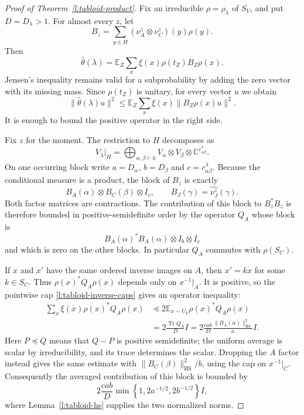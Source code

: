 \begin{proof}[Proof of Theorem~\ref{l:tabloid-product}]
Fix an irreducible $\rho=\rho_\lambda$ of $S_V$, and put
$D=D_\lambda>1$.  For almost every $z$, let
\[
 B_z=\sum_{y\in H}(\nu_A^z\otimes\nu_C^z)(y)\rho(y).
\]
Then
\[
 \widehat\theta(\lambda)
 =\mathbb E_Z\sum_x\xi(x)\rho(t_Z)B_Z\rho(x).
\]
Jensen's inequality remains valid for a subprobability by adding
the zero vector with its missing mass.  Since $\rho(t_Z)$ is
unitary, for every vector $u$ we obtain
\begin{equation}
 \|\widehat\theta(\lambda)u\|^2
 \le\mathbb E_Z\sum_x\xi(x)\|B_Z\rho(x)u\|^2.
 \label{l:tabloid-jensen}
\end{equation}
It is enough to bound the positive operator in the right side.

Fix $z$ for the moment.  The restriction to $H$ decomposes as
\[
 V_\lambda\big|_H
 =\bigoplus_{\alpha,\beta\vdash h}
      V_\alpha\otimes V_\beta\otimes
      \mathbb C^{c_{\alpha\beta}^\lambda}.
\]
On one occurring block write $a=D_\alpha$, $b=D_\beta$ and
$c=c_{\alpha\beta}^\lambda$.  Because the conditional measure is
a product, the block of $B_z$ is exactly
\[
 B_A(\alpha)\otimes B_C(\beta)\otimes I_c,
 \qquad B_J(\gamma)=\widehat{\nu_J^z}(\gamma).
\]
Both factor matrices are contractions.  The contribution of this
block to $B_z^*B_z$ is therefore bounded in positive-semidefinite
order by the operator $Q_A$ whose block is
\[
 B_A(\alpha)^*B_A(\alpha)\otimes I_b\otimes I_c
\]
and which is zero on the other blocks.  In particular $Q_A$
commutes with $\rho(S_C)$.

If $x$ and $x'$ have the same ordered inverse images on $A$, then
$x'=kx$ for some $k\in S_C$.  Thus
$\rho(x)^*Q_A\rho(x)$ depends only on $x^{-1}|_A$.
It is positive, so the pointwise cap
\eqref{l:tabloid-inverse-caps} gives an operator inequality:
\begin{align*}
 \sum_x\xi(x)\rho(x)^*Q_A\rho(x)
 &\preceq 2\mathbb E_{x\sim U_V}\rho(x)^*Q_A\rho(x)\\
 &=2\frac{\operatorname{Tr}Q_A}{D}I
 =2\frac{cab}{D}
       \frac{\|B_A(\alpha)\|_{\mathrm{HS}}^2}{a}I.
\end{align*}
Here $P\preceq Q$ means that $Q-P$ is positive semidefinite;
the uniform average is scalar by irreducibility, and its trace
determines the scalar.  Dropping the $A$ factor instead gives the
same estimate with
$\|B_C(\beta)\|_{\mathrm{HS}}^2/b$, using the cap on
$x^{-1}|_C$.  Consequently the averaged contribution of this
block is bounded by
\begin{equation}
 2\frac{cab}{D}
 \min\left\{1,2a^{-1/2},2b^{-1/2}\right\}I,
 \label{l:tabloid-one-block}
\end{equation}
where Lemma~\ref{l:tabloid-hs} supplies the two normalized norms.


\end{proof}
